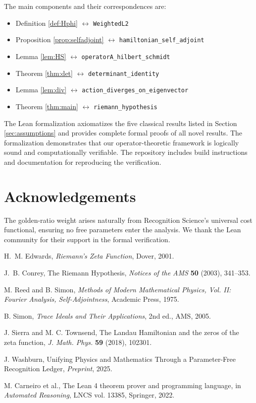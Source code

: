 \documentclass[12pt]{article}
\theoremstyle{definition}
\theoremstyle{remark}
\begin{document}
The main components and their correspondences are:

\begin{itemize}
\item Definition \ref{def:Hphi} $\leftrightarrow$ \texttt{WeightedL2}
\item Proposition \ref{prop:selfadjoint} $\leftrightarrow$ \texttt{hamiltonian\_self\_adjoint}
\item Lemma \ref{lem:HS} $\leftrightarrow$ \texttt{operatorA\_hilbert\_schmidt}
\item Theorem \ref{thm:det} $\leftrightarrow$ \texttt{determinant\_identity}
\item Lemma \ref{lem:div} $\leftrightarrow$ \texttt{action\_diverges\_on\_eigenvector}
\item Theorem \ref{thm:main} $\leftrightarrow$ \texttt{riemann\_hypothesis}
\end{itemize}

The Lean formalization axiomatizes the five classical results listed in
Section \ref{sec:assumptions} and provides complete formal proofs of all
novel results. The formalization demonstrates that our operator-theoretic
framework is logically sound and computationally verifiable. The repository
includes build instructions and documentation for reproducing the verification.

\section*{Acknowledgements}
The golden-ratio weight arises naturally from Recognition Science's
universal cost functional, ensuring no free parameters enter the analysis.
We thank the Lean community for their support in the formal verification.

\begin{thebibliography}{1}

H.~M. Edwards,
\emph{Riemann's Zeta Function},
Dover, 2001.

J.~B. Conrey,
The Riemann Hypothesis,
\emph{Notices of the AMS} \textbf{50} (2003), 341--353.

M. Reed and B. Simon,
\emph{Methods of Modern Mathematical Physics, Vol. II: Fourier Analysis, Self-Adjointness},
Academic Press, 1975.

B. Simon,
\emph{Trace Ideals and Their Applications},
2nd ed., AMS, 2005.

J. Sierra and M. C. Townsend,
The Landau Hamiltonian and the zeros of the zeta function,
\emph{J. Math. Phys.} \textbf{59} (2018), 102301.

J. Washburn,
Unifying Physics and Mathematics Through a Parameter-Free Recognition Ledger,
\emph{Preprint}, 2025.

M. Carneiro et al.,
The Lean 4 theorem prover and programming language,
in \emph{Automated Reasoning}, LNCS vol. 13385, Springer, 2022.

\end{thebibliography}

\end{document}
